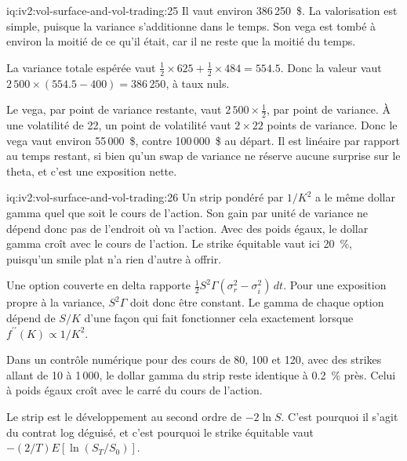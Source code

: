 \begin{solution}{iq:iv2:vol-surface-and-vol-trading:25}
Il vaut environ 386\,250~\$. La valorisation est simple, puisque la variance s'additionne dans le temps. Son vega est tombé à environ la moitié de ce qu'il était, car il ne reste que la moitié du temps.

La variance totale espérée vaut $\tfrac12 \times 625 + \tfrac12 \times 484 = 554.5$. Donc la valeur vaut $2\,500 \times (554.5 - 400) = 386\,250$, à taux nuls.

Le vega, par point de variance restante, vaut $2\,500 \times \tfrac12$, par point de variance. À une volatilité de 22, un point de volatilité vaut $2 \times 22$ points de variance. Donc le vega vaut environ 55\,000~\$, contre 100\,000~\$ au départ. Il est linéaire par rapport au temps restant, si bien qu'un swap de variance ne réserve aucune surprise sur le theta, et c'est une exposition nette.

\end{solution}

\begin{solution}{iq:iv2:vol-surface-and-vol-trading:26}
Un strip pondéré par $1/K^2$ a le même dollar gamma quel que soit le cours de l'action. Son gain par unité de variance ne dépend donc pas de l'endroit où va l'action. Avec des poids égaux, le dollar gamma croît avec le cours de l'action. Le strike équitable vaut ici 20~\%, puisqu'un smile plat n'a rien d'autre à offrir.

Une option couverte en delta rapporte $\tfrac12S^2\Gamma(\sigma_r^2 - \sigma_i^2)\,dt$. Pour une exposition propre à la variance, $S^2\Gamma$ doit donc être constant. Le gamma de chaque option dépend de $S/K$ d'une façon qui fait fonctionner cela exactement lorsque $f^{\prime\prime}(K) \propto 1/K^2$.

Dans un contrôle numérique pour des cours de 80, 100 et 120, avec des strikes allant de 10 à 1\,000, le dollar gamma du strip reste identique à 0.2~\% près. Celui à poids égaux croît avec le carré du cours de l'action.

Le strip est le développement au second ordre de $-2\ln S$. C'est pourquoi il s'agit du contrat log déguisé, et c'est pourquoi le strike équitable vaut $-(2/T)E[\ln(S_T/S_0)]$.

\end{solution}

